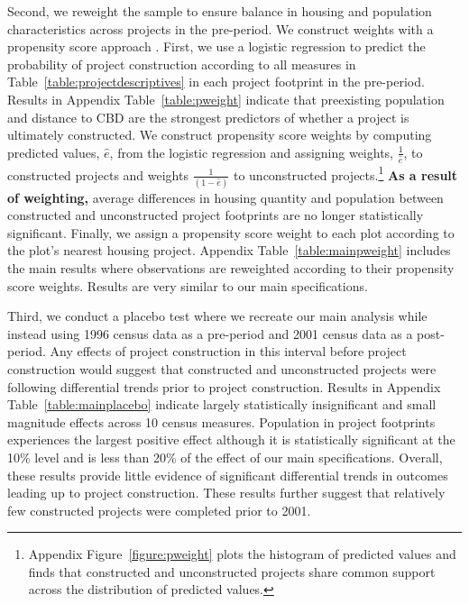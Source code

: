 \documentclass[12pt]{article}
\newcommand{\rv}{}
\newcommand{\rw}{\textbf}
\begin{document}
Second, we reweight the sample to ensure balance in housing and population characteristics across projects in the pre-period.  We construct weights with a propensity score approach \citep{angrist2008mostly}.  First, we use a logistic regression to predict the probability of project construction according to \rv{all measures in Table~\ref{table:projectdescriptives} in each project footprint in the pre-period.}  Results in Appendix Table~\ref{table:pweight} indicate that preexisting \rv{population and distance to CBD are the strongest predictors} of whether a project is ultimately constructed.  We construct propensity score weights by computing predicted values, $\hat{e}$, from the logistic regression and assigning weights, $\frac{1}{\hat{e}}$, to constructed projects and weights $\frac{1}{(1-\hat{e})}$ to unconstructed projects.\footnote{Appendix Figure~\ref{figure:pweight} plots the histogram of predicted values and finds that constructed and unconstructed projects share common support across the distribution of predicted values.}  \rw{As a result of weighting,} average differences in housing quantity and population between constructed and unconstructed project footprints are no longer statistically significant.  Finally, we assign a propensity score weight to each plot according to the plot's nearest housing project.  Appendix Table~\ref{table:mainpweight} includes the main results where observations are reweighted according to their propensity score weights.  Results are very similar to our main specifications.

Third, we conduct a placebo test where we recreate our main analysis while instead using 1996 census data as a pre-period and 2001 census data as a post-period.  Any effects of project construction in this interval before project construction would suggest that constructed and unconstructed projects were following differential trends prior to project construction.  Results in Appendix Table~\ref{table:mainplacebo} indicate largely statistically insignificant and small magnitude effects across 10 census measures.  Population in project footprints experiences the largest positive effect although it is statistically significant at the 10\% level and is less than 20\% of the effect of our main specifications.  Overall, these results provide little evidence of \rv{significant} differential trends in outcomes leading up to project construction.  \rv{These results further suggest that relatively few constructed projects were completed prior to 2001.}  
\end{document}
